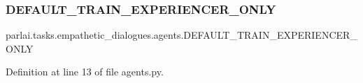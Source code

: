 \subsubsection{\texorpdfstring{D\+E\+F\+A\+U\+L\+T\+\_\+\+T\+R\+A\+I\+N\+\_\+\+E\+X\+P\+E\+R\+I\+E\+N\+C\+E\+R\+\_\+\+O\+N\+LY}{DEFAULT\_TRAIN\_EXPERIENCER\_ONLY}}
{\footnotesize\ttfamily parlai.\+tasks.\+empathetic\+\_\+dialogues.\+agents.\+D\+E\+F\+A\+U\+L\+T\+\_\+\+T\+R\+A\+I\+N\+\_\+\+E\+X\+P\+E\+R\+I\+E\+N\+C\+E\+R\+\_\+\+O\+N\+LY}



Definition at line 13 of file agents.\+py.

